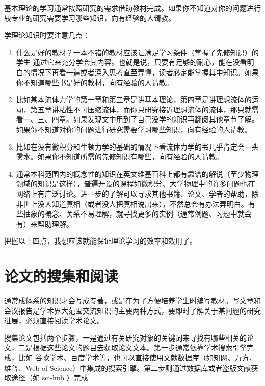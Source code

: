 \documentclass[a4paper,10pt,english]{sphinxmanual}
\begin{document}
基本理论的学习通常按照研究的需求借助教材完成。如果你不知道对你的问题进行较专业的研究需要学习哪些知识，向有经验的人请教。

学理论知识时要注意几点：
\begin{enumerate}
\item {} 
 什么是好的教材？一本不错的教材应该让满足学习条件（掌握了先修知识）的学生  通过它来充分学会其内容。也就是说，只要有足够的耐心，能在没看明白的情况下再看一遍或者深入思考直至弄懂，读者必定能掌握其中知识。如果你不知道哪些书是好的教材，向有经验的人请教。

\item {} 
 比如某本流体力学的第一章和第三章是讲基本理论，第四章是讲理想流体的运动，第五章讲粘性不可压缩流体，而你只研究接近理想流体的流体，那只就需看一、三、四章。如果发现文中用到了自己没学的知识再翻阅其他章节了解。如果你不知道对你的问题进行研究需要学习哪些知识，向有经验的人请教。

\item {} 
 比如在没有微积分和牛顿力学的基础的情况下看流体力学的书几乎肯定会一头雾水。如果你不知道所需的先修知识有哪些，向有经验的人请教。

\item {} 
 通常本科范围内的概念性的知识在英文维基百科上都有靠谱的解说（至少物理领域的知识是这样），普遍开设的课程如微积分、大学物理中的许多问题也在网络上有广泛讨论。进一步的了解可以寻求其他书籍、论文、学者的帮助，除非世上没人知道真相（或者没人把真相说出来），不然总会有办法弄明白。有些抽象的概念、关系不易理解，就寻找更多的实例（通常例题、习题中就会有）来帮助理解。

\end{enumerate}

把握以上四点，我想应该就能保证理论学习的效率和效用了。


\section{论文的搜集和阅读}
\label{\detokenize{5. GetInfo:id3}}
通常成体系的知识才会写成专著，或是在为了方便培养学生时编写教材。写文章和会议报告是学术界大范围交流知识的主要两种方式，要即时了解关于某问题的研究进展，必须直接阅读学术论文。

搜集论文包括两个步骤，一是通过有关研究对象的关键词来寻找有哪些相关的论文，二是根据这些论文的题目去获取论文文本。第一步通常依靠学术搜索引擎完成，比如 谷歌学术、百度学术等，也可以直接使用文献数据库（如知网、万方、维普、Web of Science）中集成的搜索引擎。第二步则通过数据库或者盗版文献获取途径（如 sci-hub ）完成.
\end{document}
